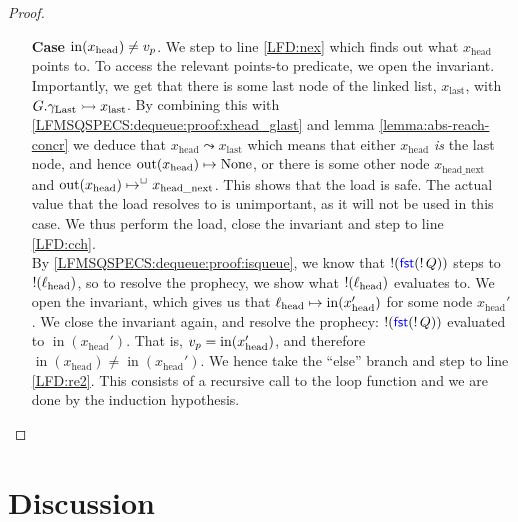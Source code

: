\documentclass[a4paper, 10pt]{report}
\theoremstyle{definition}
\newcommand{\locN}[1]{\loc_{\mathrm{#1}}}
\newcommand{\lochead}{\locN{head}}
\newcommand{\nIn}[1]{\operatorname{in}(#1)}
\newcommand{\nOut}[1]{\operatorname{out}(#1)}
\newcommand{\node}{x}
\newcommand{\nodeN}[1]{\node_{\mathrm{#1}}}
\newcommand{\nodehead}{\nodeN{head}}
\newcommand{\nodelast}{\nodeN{last}}
\newcommand{\nodeheadnext}{\nodeN{head\_next}}
\newcommand{\prophval}{\val_p}
\newcommand{\Qg}{G}
\newcommand{\glast}{\gname_{\mathrm{Last}}}
\newcommand{\reach}[2]{#1 \leadsto #2}
\newcommand{\ap}[2]{#1 \rightarrowtail #2}
\begin{document}
\begin{proof}
\begin{itemize}
    \item[\textbf{Case}] $\nIn{\nodehead} \neq \prophval$.
    We step to line \ref{LFD:nex} which finds out what $\nodehead$ points to. To access the relevant points-to predicate, we open the invariant. Importantly, we get that there is some last node of the linked list, $\nodelast$, with $\ap{\Qg.\glast}{\nodelast}$. By combining this with \ref{LFMSQSPECS:dequeue:proof:xhead_glast} and lemma \ref{lemma:abs-reach-concr} we deduce that $\reach{\nodehead}{\nodelast}$ which means that either $\nodehead$ \textit{is} the last node, and hence $\nOut{\nodehead} \mapsto \None$, or there is some other node $\nodeheadnext$ and $\nOut{\nodehead} \mapsto^{\persistently} \nodeheadnext$. This shows that the load is safe. The actual value that the load resolves to is unimportant, as it will not be used in this case. We thus perform the load, close the invariant and step to line \ref{LFD:cch}.\\
    By \ref{LFMSQSPECS:dequeue:proof:isqueue}, we know that $\mathop{!}(\operatorname{\textsf{\color{blue} fst}} (\mathop{!} Q))$ steps to $\deref(\lochead)$, so to resolve the prophecy, we show what $\deref(\lochead)$ evaluates to. We open the invariant, which gives us that $\lochead \mapsto \nIn{\nodehead'}$ for some node $\nodehead'$. We close the invariant again, and resolve the prophecy: $\mathop{!}(\operatorname{\textsf{\color{blue} fst}} (\mathop{!} Q))$ evaluated to $\nIn{\nodehead'}$. That is, $\prophval = \nIn{\nodehead'}$, and therefore $\nIn{\nodehead} \neq \nIn{\nodehead'}$. We hence take the ``else'' branch and step to line \ref{LFD:re2}. This consists of a recursive call to the loop function and we are done by the induction hypothesis.
  \end{itemize}
\end{proof}

\section{Discussion}
\label{LFMSQSPECS:section:discussion}
\end{document}
